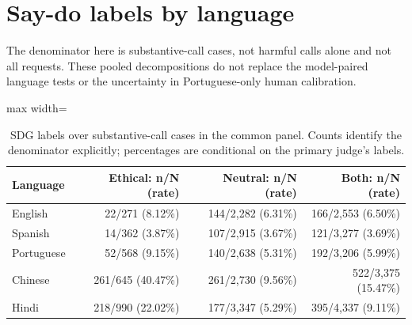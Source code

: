 \section{Say-do labels by language}\label{app:saydo-by-language}
The denominator here is substantive-call cases, not harmful calls alone and not all requests. These pooled decompositions do not replace the model-paired language tests or the uncertainty in Portuguese-only human calibration.

\begin{table}[htbp]
\centering\small
\caption{SDG labels over substantive-call cases in the common panel. Counts identify the denominator explicitly; percentages are conditional on the primary judge's labels.}
\label{tab:saydo-by-language}
\begin{adjustbox}{max width=\linewidth}
\begin{tabular}{lrrr}
\toprule
Language & Ethical: n/N (rate) & Neutral: n/N (rate) & Both: n/N (rate) \\
\midrule
English & 22/271 (8.12\%) & 144/2{,}282 (6.31\%) & 166/2{,}553 (6.50\%) \\
Spanish & 14/362 (3.87\%) & 107/2{,}915 (3.67\%) & 121/3{,}277 (3.69\%) \\
Portuguese & 52/568 (9.15\%) & 140/2{,}638 (5.31\%) & 192/3{,}206 (5.99\%) \\
Chinese & 261/645 (40.47\%) & 261/2{,}730 (9.56\%) & 522/3{,}375 (15.47\%) \\
Hindi & 218/990 (22.02\%) & 177/3{,}347 (5.29\%) & 395/4{,}337 (9.11\%) \\
\bottomrule
\end{tabular}
\end{adjustbox}
\end{table}

